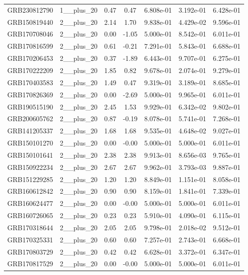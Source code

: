\documentclass[12pt]{article}
\begin{document}
\begin{table}[h!]
{\begin{tabular}{l c c c c c c}
GRB230812790 & 1__plus_20 & 0.47 & 0.47 & 6.808e-01 & 3.192e-01 & 6.428e-01 \\
GRB150819440 & 2__plus_20 & 2.14 & 1.70 & 9.838e-01 & 4.429e-02 & 9.596e-01 \\
GRB170708046 & 2__plus_20 & 0.00 & -1.05 & 5.000e-01 & 8.542e-01 & 6.011e-01 \\
GRB170816599 & 2__plus_20 & 0.61 & -0.21 & 7.291e-01 & 5.843e-01 & 6.688e-01 \\
GRB170206453 & 2__plus_20 & 0.37 & -1.89 & 6.443e-01 & 9.707e-01 & 6.275e-01 \\
GRB170222209 & 2__plus_20 & 1.85 & 0.82 & 9.678e-01 & 2.074e-01 & 9.279e-01 \\
GRB170403583 & 2__plus_20 & 1.49 & 0.47 & 9.319e-01 & 3.189e-01 & 8.685e-01 \\
GRB170826369 & 2__plus_20 & 0.00 & -2.69 & 5.000e-01 & 9.965e-01 & 6.011e-01 \\
GRB190515190 & 2__plus_20 & 2.45 & 1.53 & 9.929e-01 & 6.342e-02 & 9.802e-01 \\
GRB200605762 & 2__plus_20 & 0.87 & -0.19 & 8.078e-01 & 5.741e-01 & 7.268e-01 \\
GRB141205337 & 2__plus_20 & 1.68 & 1.68 & 9.535e-01 & 4.648e-02 & 9.027e-01 \\
GRB150101270 & 2__plus_20 & 0.00 & -0.00 & 5.000e-01 & 5.000e-01 & 6.011e-01 \\
GRB150101641 & 2__plus_20 & 2.38 & 2.38 & 9.913e-01 & 8.656e-03 & 9.765e-01 \\
GRB150922234 & 2__plus_20 & 2.67 & 2.67 & 9.962e-01 & 3.793e-03 & 9.887e-01 \\
GRB151229285 & 2__plus_20 & 1.20 & 1.20 & 8.849e-01 & 1.151e-01 & 8.058e-01 \\
GRB160612842 & 2__plus_20 & 0.90 & 0.90 & 8.159e-01 & 1.841e-01 & 7.339e-01 \\
GRB160624477 & 2__plus_20 & 0.00 & -0.00 & 5.000e-01 & 5.000e-01 & 6.011e-01 \\
GRB160726065 & 2__plus_20 & 0.23 & 0.23 & 5.910e-01 & 4.090e-01 & 6.115e-01 \\
GRB170318644 & 2__plus_20 & 2.05 & 2.05 & 9.798e-01 & 2.018e-02 & 9.512e-01 \\
GRB170325331 & 2__plus_20 & 0.60 & 0.60 & 7.257e-01 & 2.743e-01 & 6.668e-01 \\
GRB170803729 & 2__plus_20 & 0.42 & 0.42 & 6.628e-01 & 3.372e-01 & 6.347e-01 \\
GRB170817529 & 2__plus_20 & 0.00 & -0.00 & 5.000e-01 & 5.000e-01 & 6.011e-01 \\

\end{tabular}}
\end{table}
\end{document}
